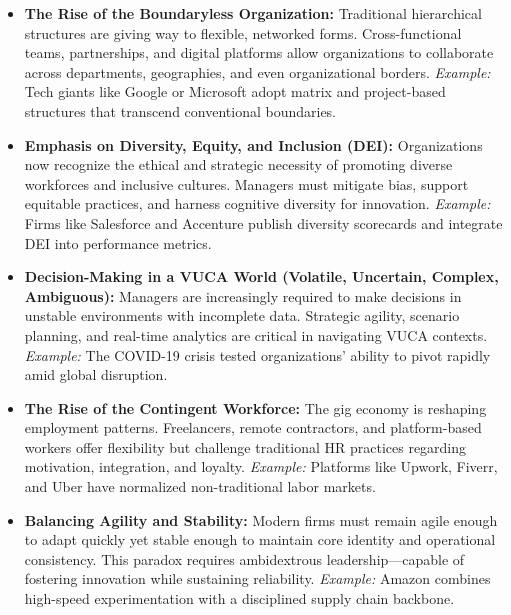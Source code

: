 \documentclass[10pt,a4paper]{book}
\begin{document}
\begin{multicols}{2}
\begin{itemize}

    \item \textbf{The Rise of the Boundaryless Organization:}  
    Traditional hierarchical structures are giving way to flexible, networked forms. Cross-functional teams, partnerships, and digital platforms allow organizations to collaborate across departments, geographies, and even organizational borders.  
    \textit{Example:} Tech giants like Google or Microsoft adopt matrix and project-based structures that transcend conventional boundaries.

    \item \textbf{Emphasis on Diversity, Equity, and Inclusion (DEI):}  
    Organizations now recognize the ethical and strategic necessity of promoting diverse workforces and inclusive cultures. Managers must mitigate bias, support equitable practices, and harness cognitive diversity for innovation.  
    \textit{Example:} Firms like Salesforce and Accenture publish diversity scorecards and integrate DEI into performance metrics.

    \item \textbf{Decision-Making in a VUCA World (Volatile, Uncertain, Complex, Ambiguous):}  
    Managers are increasingly required to make decisions in unstable environments with incomplete data. Strategic agility, scenario planning, and real-time analytics are critical in navigating VUCA contexts.  
    \textit{Example:} The COVID-19 crisis tested organizations' ability to pivot rapidly amid global disruption.

    \item \textbf{The Rise of the Contingent Workforce:}  
    The gig economy is reshaping employment patterns. Freelancers, remote contractors, and platform-based workers offer flexibility but challenge traditional HR practices regarding motivation, integration, and loyalty.  
    \textit{Example:} Platforms like Upwork, Fiverr, and Uber have normalized non-traditional labor markets.

    \item \textbf{Balancing Agility and Stability:}  
    Modern firms must remain agile enough to adapt quickly yet stable enough to maintain core identity and operational consistency. This paradox requires ambidextrous leadership—capable of fostering innovation while sustaining reliability.  
    \textit{Example:} Amazon combines high-speed experimentation with a disciplined supply chain backbone.


\end{itemize}
\end{multicols}
\end{document}
